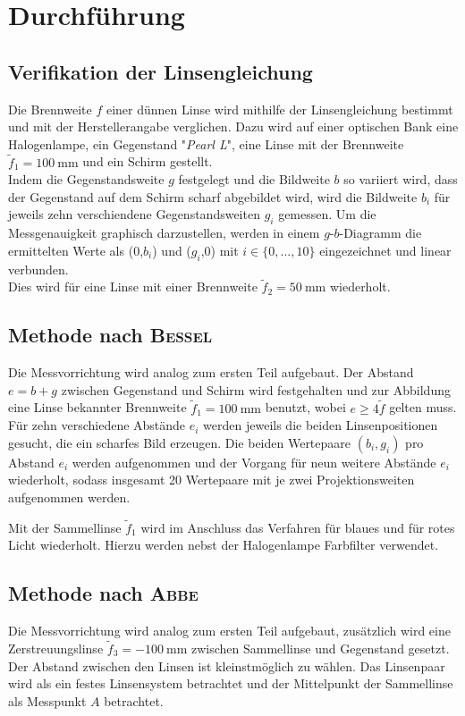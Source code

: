 \section{Durchführung}
\label{sec:Durchfuehrung}
\subsection{Verifikation der Linsengleichung}
\label{sec:Durchfuehrung1}
Die Brennweite $f$ einer dünnen Linse wird mithilfe der Linsengleichung bestimmt und mit der Herstellerangabe verglichen.
Dazu wird auf einer optischen Bank eine Halogenlampe, ein Gegenstand "\emph{Pearl L}",  eine Linse mit der Brennweite $\tilde{f}_1=\SI{100}{\milli\meter}$ und ein Schirm gestellt. \\
Indem die Gegenstandsweite $g$ festgelegt und die Bildweite $b$ so variiert wird, dass der Gegenstand auf dem Schirm scharf abgebildet wird, wird die Bildweite $b_i$ für jeweils zehn verschiendene Gegenstandsweiten $g_i$ gemessen.
Um die Messgenauigkeit graphisch darzustellen, werden in einem $g$-$b$-Diagramm die ermittelten Werte als ($0$,$b_i$) und ($g_i$,$0$) mit $i\in \{0,...,10\}$ eingezeichnet und linear verbunden.\\
Dies wird für eine Linse mit einer Brennweite $\tilde{f}_2=\SI{50}{\milli\meter}$ wiederholt.


\subsection{Methode nach \texorpdfstring{\textsc{Bessel}}{Bessel}}
\label{sec:Durchfuehrung2}
Die Messvorrichtung wird analog zum ersten Teil aufgebaut.
Der Abstand \\$e=b+g$ zwischen Gegenstand und Schirm wird festgehalten und zur Abbildung eine Linse bekannter Brennweite $\tilde{f}_1=\SI{100}{\milli\meter}$ benutzt, wobei $e\ge4\tilde{f}$ gelten muss.
Für zehn verschiedene Abstände $e_i$ werden jeweils die beiden Linsenpositionen gesucht, die ein scharfes Bild erzeugen. 
Die beiden Wertepaare $(b_i,g_i)$ pro Abstand $e_i$ werden aufgenommen und der Vorgang für neun weitere Abstände $e_i$ wiederholt, sodass insgesamt 20 Wertepaare mit je zwei Projektionsweiten aufgenommen werden.

Mit der Sammellinse $\tilde{f}_1$ wird im Anschluss das Verfahren für blaues und für rotes Licht wiederholt. 
Hierzu werden nebst der Halogenlampe Farbfilter verwendet.

\subsection{Methode nach \texorpdfstring{\textsc{Abbe}}{Abbe}}
\label{sec:Durchfuehrung3}
Die Messvorrichtung wird analog zum ersten Teil aufgebaut, zusätzlich wird eine Zerstreuungslinse  $\tilde{f}_3=\SI{-100}{\milli\meter}$ zwischen Sammellinse und Gegenstand gesetzt.
Der Abstand zwischen den Linsen ist kleinstmöglich zu wählen.
Das Linsenpaar wird als ein festes Linsensystem betrachtet und der Mittelpunkt der Sammellinse als Messpunkt $A$ betrachtet.


